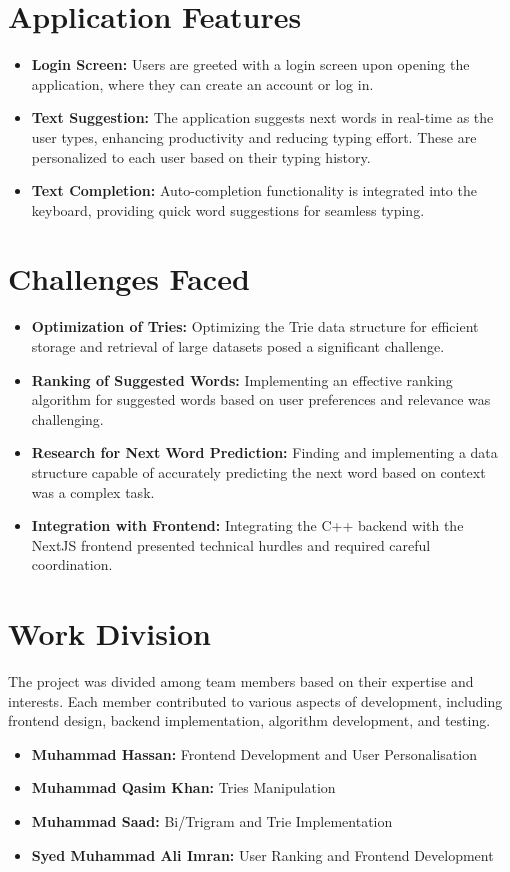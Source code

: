 \documentclass{article}
\begin{document}
\section*{Application Features}
\begin{itemize}[label=-]
    \item \textbf{Login Screen:} Users are greeted with a login screen upon opening the application, where they can create an account or log in.
    \item \textbf{Text Suggestion:} The application suggests next words in real-time as the user types, enhancing productivity and reducing typing effort. These are personalized to each user based on their typing history.
    \item \textbf{Text Completion:} Auto-completion functionality is integrated into the keyboard, providing quick word suggestions for seamless typing.
\end{itemize}

\section*{Challenges Faced}
\begin{itemize}[label=-]
    \item \textbf{Optimization of Tries:} Optimizing the Trie data structure for efficient storage and retrieval of large datasets posed a significant challenge.
    \item \textbf{Ranking of Suggested Words:} Implementing an effective ranking algorithm for suggested words based on user preferences and relevance was challenging.
    \item \textbf{Research for Next Word Prediction:} Finding and implementing a data structure capable of accurately predicting the next word based on context was a complex task.
    \item \textbf{Integration with Frontend:} Integrating the C++ backend with the NextJS frontend presented technical hurdles and required careful coordination.
\end{itemize}

\section*{Work Division}
The project was divided among team members based on their expertise and interests. Each member contributed to various aspects of development, including frontend design, backend implementation, algorithm development, and testing.
\begin{itemize}[label=-]
    \item \textbf{Muhammad Hassan:} Frontend Development and User Personalisation
    \item \textbf{Muhammad Qasim Khan:} Tries Manipulation
    \item \textbf{Muhammad Saad:} Bi/Trigram and Trie Implementation
    \item \textbf{Syed Muhammad Ali Imran:} User Ranking and Frontend Development
\end{itemize}
\end{document}
